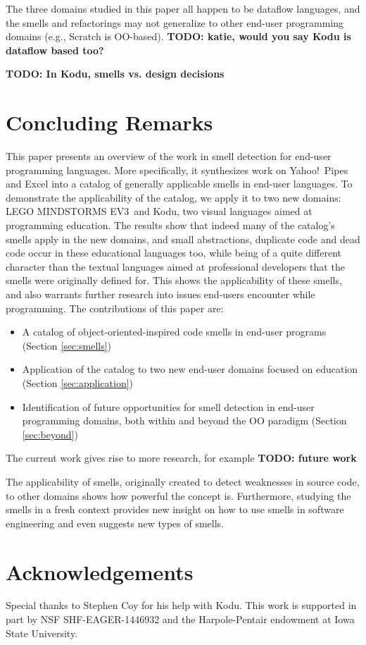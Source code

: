 \documentclass{sig-alternate}
\newcommand{\todo}[1]{\textbf{TODO: #1}}
\newcommand{\ms}{LEGO MINDSTORMS EV3}
\begin{document}
The three domains studied in this paper all happen to be dataflow languages, and the smells and refactorings may not generalize to other end-user programming domains (e.g., Scratch is OO-based). \todo{katie, would you say Kodu is dataflow based too?}


\todo{In Kodu, smells vs. design decisions}

\section{Concluding Remarks}
\label{sec:conclusions}
This paper presents an overview of the work in smell detection for end-user programming languages. More specifically, it synthesizes work on Yahoo!\ Pipes and Excel into a catalog of generally applicable smells in end-user languages. To demonstrate the applicability of the catalog, we apply it to two new domains: \ms~and Kodu, two visual languages aimed at programming education. The results show that indeed many of the catalog's smells apply in the new domains, and small abstractions, duplicate code and dead code occur in these educational languages too, while being of a quite different character than the textual languages aimed at professional developers that the smells were originally defined for. This shows the applicability of these smells, and also warrants further research into issues end-users encounter while programming. The contributions of this paper are:

\begin{itemize}
	\item A catalog of object-oriented-inspired code smells in end-user programs (Section \ref{sec:smells})
	\item Application of the catalog to two new end-user domains focused on education (Section \ref{sec:application})
	\item Identification of future opportunities for smell detection in end-user programming domains, both within and beyond the OO paradigm (Section \ref{sec:beyond})
\end{itemize}

The current work gives rise to more research, for example \todo{future work}

The applicability of smells, originally created to detect weaknesses in source code, to other domains shows how powerful the concept is. Furthermore, studying the smells in a fresh context provides new insight on how to use smells in software engineering and even suggests new types of smells. 

\balance

\section*{Acknowledgements}
Special thanks to Stephen Coy for his help with Kodu. This work is supported in part by  NSF SHF-EAGER-1446932 and the Harpole-Pentair endowment at Iowa State University.




\end{document}
